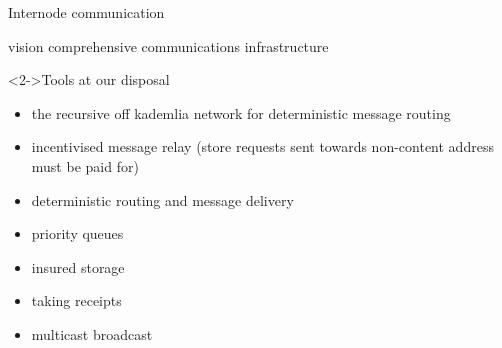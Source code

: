 \documentclass{beamer}
\begin{document}
\begin{section}{Internode communication}
\begin{frame}
 \begin{block}{vision}
 comprehensive communications infrastructure
 \end{block}
 \begin{block}<2->{Tools at our disposal}
  \begin{itemize}
   \item the recursive  off kademlia network for deterministic message routing
   \item incentivised message relay (store requests sent towards non-content address must be paid for)
   \item deterministic routing and message delivery
   \item priority queues
   \item insured storage
   \item taking receipts
   \item multicast broadcast
  \end{itemize}
 \end{block}
\end{frame}


\end{section}
\end{document}
